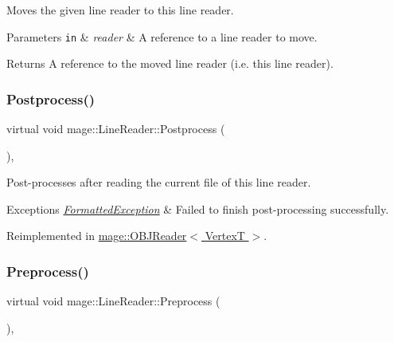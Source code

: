 Moves the given line reader to this line reader.


\begin{DoxyParams}[1]{Parameters}
\mbox{\tt in}  & {\em reader} & A reference to a line reader to move. \\
\hline
\end{DoxyParams}
\begin{DoxyReturn}{Returns}
A reference to the moved line reader (i.\+e. this line reader). 
\end{DoxyReturn}
\hypertarget{classmage_1_1_line_reader_adfde21013140a1058d3dd567204abfb5}{}\label{classmage_1_1_line_reader_adfde21013140a1058d3dd567204abfb5} 
\subsubsection{\texorpdfstring{Postprocess()}{Postprocess()}}
{\footnotesize\ttfamily virtual void mage\+::\+Line\+Reader\+::\+Postprocess (\begin{DoxyParamCaption}{ }\end{DoxyParamCaption})\hspace{0.3cm}{\ttfamily [private]}, {\ttfamily [virtual]}}

Post-\/processes after reading the current file of this line reader.


\begin{DoxyExceptions}{Exceptions}
{\em \hyperlink{structmage_1_1_formatted_exception}{Formatted\+Exception}} & Failed to finish post-\/processing successfully. \\
\hline
\end{DoxyExceptions}


Reimplemented in \hyperlink{classmage_1_1_o_b_j_reader_a248977c8300575ed2bab04df26197919}{mage\+::\+O\+B\+J\+Reader$<$ Vertex\+T $>$}.

\hypertarget{classmage_1_1_line_reader_a4de135cfb0434be786cfcfd7959031ef}{}\label{classmage_1_1_line_reader_a4de135cfb0434be786cfcfd7959031ef} 
\subsubsection{\texorpdfstring{Preprocess()}{Preprocess()}}
{\footnotesize\ttfamily virtual void mage\+::\+Line\+Reader\+::\+Preprocess (\begin{DoxyParamCaption}{ }\end{DoxyParamCaption})\hspace{0.3cm}{\ttfamily [private]}, {\ttfamily [virtual]}}


